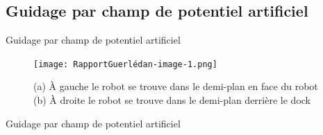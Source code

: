 \documentclass[pdftex,beamer,aspectratio=169]{beamer}
\theoremstyle{definition}
\theoremstyle{example}
\theoremstyle{plain}
\begin{document}
\subsection{Guidage par champ de potentiel artificiel}
\begin{frame}[fragile]{Guidage par champ de potentiel artificiel}
  \begin{figure}
  \centering
  \texttt{[image: RapportGuerlédan-image-1.png]}
  \caption{(a) À gauche le robot se trouve dans le demi-plan en face du robot (b) À droite le robot se trouve dans le demi-plan derrière le dock}
\end{figure}

\end{frame}

\begin{frame}[fragile]{Guidage par champ de potentiel artificiel}


\end{frame}
\end{document}

